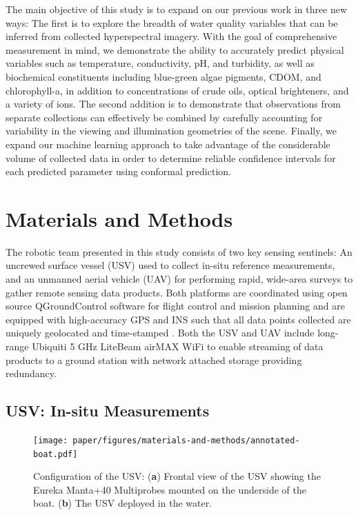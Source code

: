 \documentclass[remotesensing,article,submit,pdftex,moreauthors]{Definitions/mdpi}
\begin{document}
The main objective of this study is to expand on our previous work in three new ways: The first is to explore the breadth of water quality variables that can be inferred from collected hyperspectral imagery. With the goal of comprehensive measurement in mind, we demonstrate the ability to accurately predict physical variables such as temperature, conductivity, pH, and turbidity, as well as biochemical constituents including blue-green algae pigments, CDOM, and chlorophyll-a, in addition to concentrations of crude oils, optical brighteners, and a variety of ions. The second addition is to demonstrate that observations from separate collections can effectively be combined by carefully accounting for variability in the viewing and illumination geometries of the scene. Finally, we expand our machine learning approach to take advantage of the considerable volume of collected data in order to determine reliable confidence intervals for each predicted parameter using conformal prediction.




\section{Materials and Methods}

 The robotic team presented in this study consists of two key sensing sentinels: An uncrewed surface vessel (USV) used to collect in-situ reference measurements, and an unmanned aerial vehicle (UAV) for performing rapid, wide-area surveys to gather remote sensing data products. Both platforms are coordinated using open source QGroundControl software for flight control and mission planning and are equipped with high-accuracy GPS and INS such that all data points collected are uniquely geolocated and time-stamped \cite{qgroundcontrol}. Both the USV and UAV include long-range Ubiquiti 5 GHz LiteBeam airMAX WiFi to enable streaming of data products to a ground station with network attached storage providing redundancy.

\subsection{USV: In-situ Measurements}

\begin{figure}[t!]
\texttt{[image: paper/figures/materials-and-methods/annotated-boat.pdf]}
\caption{ Configuration of the USV: (\textbf{a}) Frontal view of the USV showing the Eureka Manta+40 Multiprobes mounted on the underside of the boat. (\textbf{b}) The USV deployed in the water.\label{fig:boat-components}}
\end{figure} 
\end{document}
